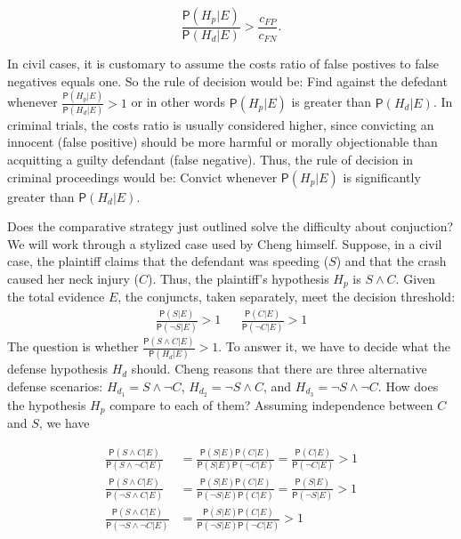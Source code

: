 \documentclass[10pt,dvipsnames,enabledeprecatedfontcommands]{scrartcl}
\newcommand{\n}{\neg}
\newcommand{\et}{\wedge}
\newcommand{\pr}[1]{\mathsf{P}(#1)}
\begin{document}
\[\frac{\pr{H_p \vert E}}{\pr{H_d \vert E}} > \frac{c_{FP}}{c_{FN}}.\]

\noindent In civil cases, it is customary to assume the costs ratio of
false postives to false negatives equals one. So the rule of decision
would be: Find against the defedant whenever
\(\frac{\pr{H_p \vert E}}{\pr{H_d \vert E}} > 1\) or in other words
\(\pr{H_p \vert E}\) is greater than \(\pr{H_d \vert E}\). In criminal
trials, the costs ratio is usually considered higher, since convicting
an innocent (false positive) should be more harmful or morally
objectionable than acquitting a guilty defendant (false negative). Thus,
the rule of decision in criminal proceedings would be: Convict whenever
\(\pr{H_p \vert E}\) is significantly greater than \(\pr{H_d \vert E}\).

Does the comparative strategy just outlined solve the difficulty about
conjuction? We will work through a stylized case used by Cheng himself.
Suppose, in a civil case, the plaintiff claims that the defendant was
speeding (\(S\)) and that the crash caused her neck injury (\(C\)).
Thus, the plaintiff's hypothesis \(H_p\) is \(S\et C\). Given the total
evidence \(E\), the conjuncts, taken separately, meet the decision
threshold: \begin{align}
 \nonumber 
 \frac{\pr{S\vert E}}{\pr{\neg S \vert E}} > 1   & & \frac{\pr{C\vert E}}{\pr{\neg C \vert E}} > 1
\end{align} \noindent The question is whether
\(\frac{\pr{S\et C\vert E}}{\pr{H_d \vert E}}>1\). To answer it, we have
to decide what the defense hypothesis \(H_d\) should. Cheng reasons that
there are three alternative defense scenarios: \(H_{d_1}= S\et \n C\),
\(H_{d_2}=\n S \et C\), and \(H_{d_3}=\n S \et \n C\). How does the
hypothesis \(H_p\) compare to each of them? Assuming independence
between \(C\) and \(S\), we have

\begin{align}\label{eq:cheng-multiplication}
\frac{\pr{S\et C\vert E}}{\pr{S\et \n C\vert E}} & = \frac{\pr{S\vert E}\pr{C\vert E}}{\pr{S \vert E}\pr{\n C \vert E}}  =\frac{\pr{C\vert E}}{\pr{\n C \vert E}} > 1 \\
\nonumber
\frac{\pr{S\et C\vert E}}{\pr{\n S\et C\vert E}} & = \frac{\pr{S\vert E}\pr{C\vert E}}{\pr{\n S \vert E}\pr{C\vert E}}  = \frac{\pr{S\vert E}}{\pr{\n S \vert E}} > 1 \\
\nonumber
\frac{\pr{S\et C\vert E}}{\pr{\n S\et \n C\vert E}} & = \frac{\pr{S\vert E}\pr{C\vert E}}{\pr{\n S \vert E}\pr{\n C \vert E}}   > 1 
\end{align}
\end{document}
